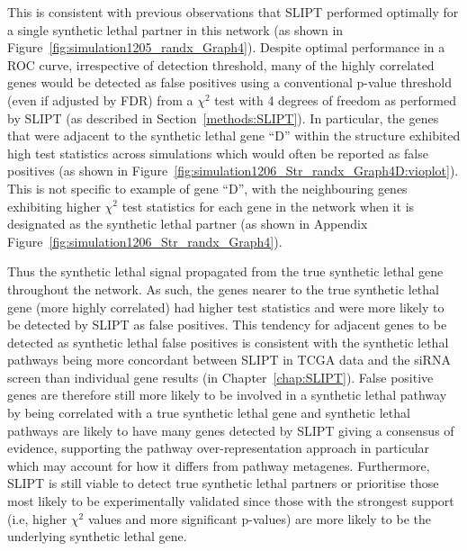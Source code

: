 This is consistent with previous observations that \gls{SLIPT} performed optimally for a single \gls{synthetic lethal} partner in this network (as shown in Figure~\ref{fig:simulation1205_randx_Graph4}). Despite optimal performance in a \gls{ROC} curve, irrespective of detection threshold, many of the highly correlated genes would be detected as false positives using a conventional p-value threshold (even if adjusted by \gls{FDR}) from a $\chi^2$ test with 4 degrees of freedom as performed by \gls{SLIPT} (as described in Section~\ref{methods:SLIPT}). In particular, the genes that were adjacent to the \gls{synthetic lethal} gene ``D'' within the  structure exhibited high test statistics across simulations which would often be reported as false positives (as shown in Figure~\ref{fig:simulation1206_Str_randx_Graph4D:vioplot}). This is not specific to example of gene ``D'', with the neighbouring genes exhibiting higher $\chi^2$ test statistics for each gene in the network when it is designated as the \gls{synthetic lethal} partner (as shown in Appendix Figure~\ref{fig:simulation1206_Str_randx_Graph4}).

Thus the \gls{synthetic lethal} signal propagated from the true \gls{synthetic lethal} gene throughout the network. As such, the genes nearer to the true \gls{synthetic lethal} gene (more highly correlated) had higher test statistics and were more likely to be detected by \gls{SLIPT} as false positives. This tendency for adjacent genes to be detected as \gls{synthetic lethal} false positives is consistent with the \gls{synthetic lethal} pathways being more concordant between \gls{SLIPT} in \gls{TCGA} data \citep{TCGA2012} and the \gls{siRNA} screen \citep{Telford2015} than individual gene results (in Chapter~\ref{chap:SLIPT}). False positive genes are therefore still more likely to be involved in a \gls{synthetic lethal} pathway by being correlated with a true \gls{synthetic lethal} gene and \gls{synthetic lethal} pathways are likely to have many genes detected by \gls{SLIPT} giving a consensus of evidence, supporting the pathway over-representation approach in particular which may account for how it differs from pathway \glspl{metagene}. Furthermore, \gls{SLIPT} is still viable to detect true \gls{synthetic lethal} partners or prioritise those most likely to be experimentally validated since those with the strongest support (i.e, higher $\chi^2$ values and more significant p-values) are more likely to be the underlying \gls{synthetic lethal} gene.

